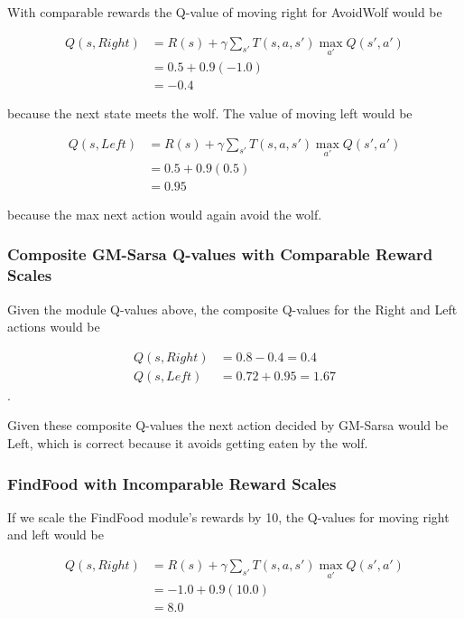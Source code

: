 With comparable rewards the Q-value of moving right for AvoidWolf would be

\begin{align*}
Q(s, Right) &= R(s) + \gamma \sum_{s'} T(s, a, s') \max_{a'} Q(s', a')\\
            &= 0.5 + 0.9 (-1.0)\\
            &= -0.4
\end{align*}

because the next state meets the wolf. The value of moving left would be

\begin{align*}
Q(s, Left) &= R(s) + \gamma \sum_{s'} T(s, a, s') \max_{a'} Q(s', a')\\
             &= 0.5 + 0.9 (0.5)\\
             &= 0.95
\end{align*}

because the max next action would again avoid the wolf.

\subsubsection{Composite GM-Sarsa Q-values with Comparable Reward Scales}

Given the module Q-values above, the composite Q-values for the Right and Left actions would be

\begin{align*}
  Q(s, Right) &= 0.8 - 0.4 = 0.4\\
  Q(s, Left) &= 0.72 + 0.95 = 1.67
\end{align*}.

Given these composite Q-values the next action decided by GM-Sarsa would be Left, which is correct because it avoids getting eaten by the wolf.

\subsubsection{FindFood with Incomparable Reward Scales}

If we scale the FindFood module's rewards by 10, the Q-values for moving right and left would be

\begin{align*}
Q(s, Right) &= R(s) + \gamma \sum_{s'} T(s, a, s') \max_{a'} Q(s', a')\\
              &= -1.0 + 0.9 (10.0)\\
              &= 8.0
\end{align*}

